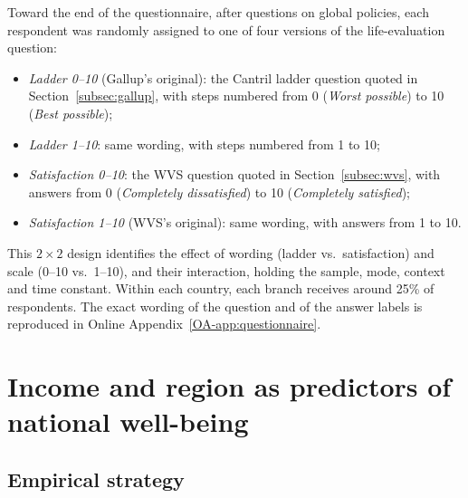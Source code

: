 \documentclass[12pt]{article}
\begin{document}
Toward the end of the questionnaire, after questions on global policies, each respondent was randomly assigned to one of four versions of the life-evaluation question:
\begin{itemize}
    \item \textit{Ladder 0--10} (Gallup's original): the Cantril ladder question quoted in Section~\ref{subsec:gallup}, with steps numbered from 0 (\textit{Worst possible}) to 10 (\textit{Best possible});
    \item \textit{Ladder 1--10}: same wording, with steps numbered from 1 to 10;
    \item \textit{Satisfaction 0--10}: the WVS question quoted in Section~\ref{subsec:wvs}, with answers from 0 (\textit{Completely dissatisfied}) to 10 (\textit{Completely satisfied});
    \item \textit{Satisfaction 1--10} (WVS's original): same wording, with answers from 1 to 10.
\end{itemize}
This $2 \times 2$ design identifies the effect of wording (ladder vs.\ satisfaction) and scale (0--10 vs.\ 1--10), and their interaction, holding the sample, mode, context and time constant. Within each country, each branch receives around 25\% of respondents. The exact wording of the question and of the answer labels is reproduced in Online Appendix~\ref{OA-app:questionnaire}.


\section{Income and region as predictors of national well-being}\label{sec:region}
\subsection{Empirical strategy}\label{subsec:method_region}
\end{document}
